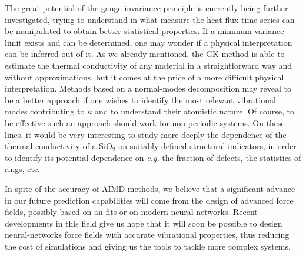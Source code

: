 The great potential of the gauge invariance principle is currently being further investigated, trying to understand in what measure the heat flux time series can be manipulated to obtain better statistical properties. If a minimum variance limit exists and can be determined, one may wonder if a physical interpretation can be inferred out of it. 
As we already mentioned, the GK method is able to estimate the thermal conductivity of any material in a straightforward way and without approximations, but it comes at the price of a more difficult physical interpretation. 
Methods based on a normal-modes decomposition \cite{AllenFeldman1989} may reveal to be a better approach if one wishes to identify the most relevant vibrational modes contributing to $\kappa$ and to understand their atomistic nature. 
Of course, to be effective such an approach should work for non-periodic systems. 
On these lines, it would be very interesting to study more deeply the dependence of the thermal conductivity of a-SiO$_2$ on suitably defined structural indicators, in order to identify its potential dependence on \emph{e.g.} the fraction of defects, the statistics of rings, etc.

In spite of the accuracy of AIMD methods, we believe that a significant advance in our future prediction capabilities will come from the design of advanced force fields, possibly based on an \abinitio fits or on modern neural networks. Recent developments in this field give us hope that it will soon be possible to design neural-networks force fields with accurate vibrational properties, thus reducing the cost of simulations and giving us the tools to tackle more complex systems. 


    
